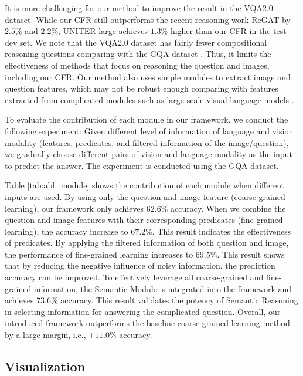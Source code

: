 \documentclass[10pt,twocolumn,letterpaper]{article}
\begin{document}
It is more challenging for our method to improve the result in the VQA2.0 dataset. While our CFR still outperforms the recent reasoning work ReGAT \cite{li2019regat} by $2.5\%$ and $2.2\%$, UNITER-large \cite{chen2020uniter} achieves $1.3\%$ higher than our CFR in the test-dev set. We note that the VQA2.0 dataset has fairly fewer compositional reasoning questions comparing with the GQA dataset \cite{hudson2019gqa}. Thus, it limits the effectiveness of methods that focus on reasoning the question and images, including our CFR. Our method also uses simple modules to extract image and question features, which may not be robust enough comparing with features extracted from complicated modules such as large-scale visual-language models \cite{li2020oscar} \cite{chen2020uniter}.




To evaluate the contribution of each module in our framework, we conduct the following experiment: Given different level of information of language and vision modality (features, predicates, and filtered information of the image/question), we gradually choose different pairs of vision and language modality as the input to predict the answer. The experiment is conducted using the GQA dataset.


Table \ref{tab:abl_module} shows the contribution of each module when different inputs are used. By using only the question and image feature (coarse-grained learning), our framework only achieves $62.6\%$ accuracy. When we combine the question and image features with their corresponding predicates (fine-grained learning), the accuracy increase to $67.2 \%$. This result indicates the effectiveness of predicates. By applying the filtered information of both question and image, the performance of fine-grained learning increases to $69.5\%$. This result shows that by reducing the negative influence of noisy information, the prediction accuracy can be improved. To effectively leverage all coarse-grained and fine-grained information, the Semantic Module is integrated into the framework and achieves $73.6 \%$ accuracy. This result validates the potency of Semantic Reasoning in selecting information for answering the complicated question. Overall, our introduced framework outperforms the baseline coarse-grained learning method by a large margin, i.e., $+11.0 \%$ accuracy.






\subsection{Visualization} 
\end{document}
